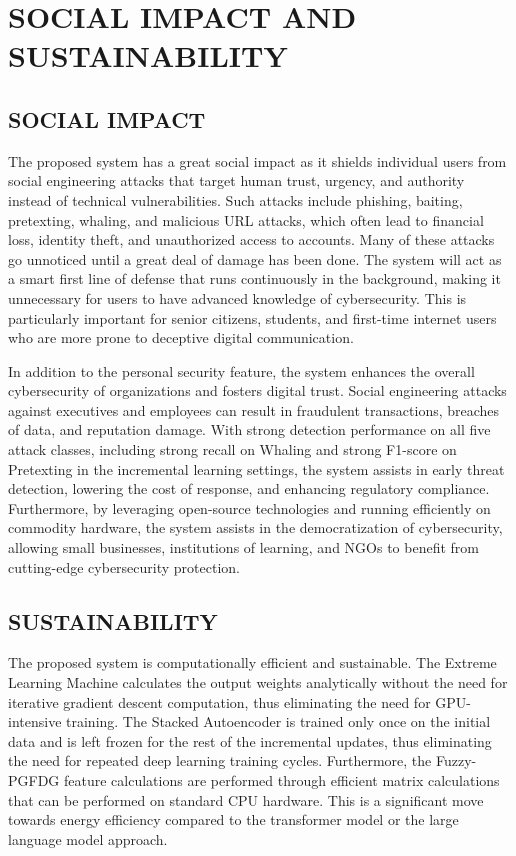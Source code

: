
\chapter{SOCIAL IMPACT AND SUSTAINABILITY}

\section{SOCIAL IMPACT}

The proposed system has a great social impact as it shields individual users from social engineering attacks that target human trust, urgency, and authority instead of technical vulnerabilities. Such attacks include phishing, baiting, pretexting, whaling, and malicious URL attacks, which often lead to financial loss, identity theft, and unauthorized access to accounts. Many of these attacks go unnoticed until a great deal of damage has been done. The system will act as a smart first line of defense that runs continuously in the background, making it unnecessary for users to have advanced knowledge of cybersecurity. This is particularly important for senior citizens, students, and first-time internet users who are more prone to deceptive digital communication.

In addition to the personal security feature, the system enhances the overall cybersecurity of organizations and fosters digital trust. Social engineering attacks against executives and employees can result in fraudulent transactions, breaches of data, and reputation damage. With strong detection performance on all five attack classes, including strong recall on Whaling and strong F1-score on Pretexting in the incremental learning settings, the system assists in early threat detection, lowering the cost of response, and enhancing regulatory compliance. Furthermore, by leveraging open-source technologies and running efficiently on commodity hardware, the system assists in the democratization of cybersecurity, allowing small businesses, institutions of learning, and NGOs to benefit from cutting-edge cybersecurity protection.

\section{SUSTAINABILITY}

The proposed system is computationally efficient and sustainable. The Extreme Learning Machine calculates the output weights analytically without the need for iterative gradient descent computation, thus eliminating the need for GPU-intensive training. The Stacked Autoencoder is trained only once on the initial data and is left frozen for the rest of the incremental updates, thus eliminating the need for repeated deep learning training cycles. Furthermore, the Fuzzy-PGFDG feature calculations are performed through efficient matrix calculations that can be performed on standard CPU hardware. This is a significant move towards energy efficiency compared to the transformer model or the large language model approach.

